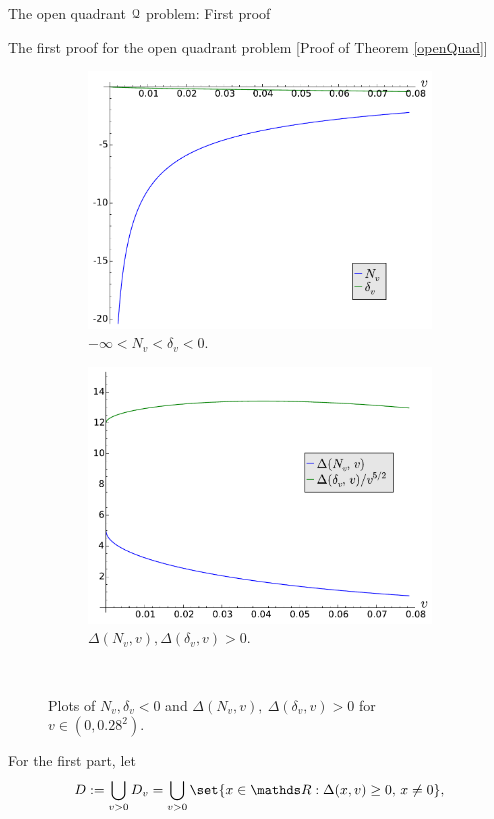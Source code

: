 \documentclass[11pt, a4paper, english, twoside, notitlepage, openright]{report}
\begin{document}
\begin{chapter}{The open quadrant $\mathcal{Q}$ problem: First proof}
\begin{section}{The first proof for the open quadrant problem} [Proof of Theorem \ref{openQuad}]
\begin{figure}[h]
\begin{subfigure}{.50\linewidth}
\includegraphics[width=1\textwidth]{plots/ch1_13_comp.pdf}
\caption{$-\infty<N_v<\delta_v<0$.\label{fig:comp}}
\end{subfigure}
\begin{subfigure}{.50\linewidth}\centering
\includegraphics[width=1\textwidth]{plots/ch1_14_positive.pdf}
\caption{$\Delta(N_{v}, v), \Delta(\delta_{v},v) > 0$.\label{fig:positive}}
\end{subfigure}\\[1ex]
\caption{Plots of $N_v,\delta_v<0$ and $\Delta(N_{v},v),\ \Delta(\delta_{v},v)>0$ for $v\in(0, 0.28^2)$.\label{fig:N_delta}}
\end{figure} For the first part, let 
$$
D:=\bigcup_{v>0}D_v=\bigcup_{v>0}\set{x\in\R:\Delta(x,v)\geq 0,\,x\neq 0},
$$
\end{section}
\end{chapter}
\end{document}
